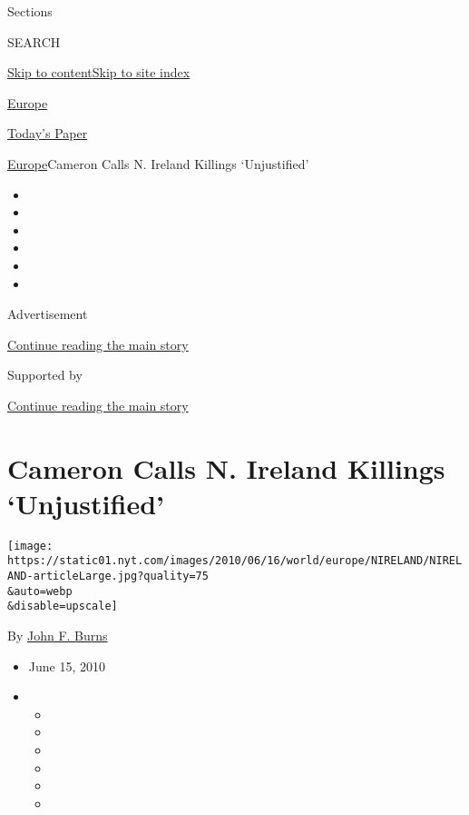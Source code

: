Sections

SEARCH

\protect\hyperlink{site-content}{Skip to
content}\protect\hyperlink{site-index}{Skip to site index}

\href{https://www.nytimes.com/section/world/europe}{Europe}

\href{https://myaccount.nytimes.com/auth/login?response_type=cookie\&client_id=vi}{}

\href{https://www.nytimes.com/section/todayspaper}{Today's Paper}

\href{/section/world/europe}{Europe}\textbar{}Cameron Calls N. Ireland
Killings `Unjustified'

\begin{itemize}
\item
\item
\item
\item
\item
\item
\end{itemize}

Advertisement

\protect\hyperlink{after-top}{Continue reading the main story}

Supported by

\protect\hyperlink{after-sponsor}{Continue reading the main story}

\hypertarget{cameron-calls-n-ireland-killings-unjustified}{%
\section{Cameron Calls N. Ireland Killings
`Unjustified'}\label{cameron-calls-n-ireland-killings-unjustified}}

\texttt{[image: https://static01.nyt.com/images/2010/06/16/world/europe/NIRELAND/NIRELAND-articleLarge.jpg?quality=75\\\&auto=webp\\\&disable=upscale]}

By \href{https://www.nytimes.com/by/john-f-burns}{John F. Burns}

\begin{itemize}
\item
  June 15, 2010
\item
  \begin{itemize}
  \item
  \item
  \item
  \item
  \item
  \item
  \end{itemize}
\end{itemize}

